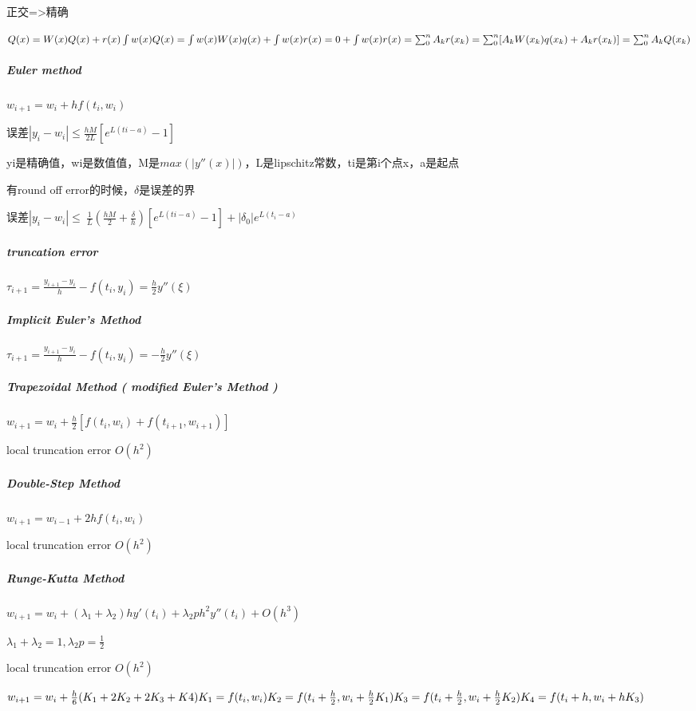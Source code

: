 \documentclass[]{article}
\let\oldsubparagraph\subparagraph
\renewcommand{\subparagraph}[1]{\oldsubparagraph{#1}\mbox{}}
\begin{document}
\begin{multicols}{3}
正交=\textgreater{}精确

\(Q(x)=W(x)Q(x)+r(x)\\
\int w(x)Q(x)=\int w(x)W(x)q(x) + \int w(x)r(x)=0+\int w(x)r(x)\\
=\sum_0^nA_kr(x_k)=\sum_0^n[A_kW(x_k)q(x_k)+A_kr(x_k)]=\sum_0^nA_kQ(x_k)\)



\subparagraph{Euler method}\label{header-c99}

\(w_{i+1}=w_i+h f(t_i, w_i)\)

误差\(|y_i-w_i|\leq\frac{hM}{2L}[e^{L(ti-a)}-1]\)

yi是精确值，wi是数值值，M是\(max(|y''(x)|)\)，L是lipschitz常数，ti是第i个点x，a是起点

有round off error的时候，\(\delta\)是误差的界

误差\( |y_i-w_i|\leq\ \frac 1 L (\frac{hM}{2}+\frac \delta h)[e^{L(ti-a)}-1] + |\delta _0|e^{L(t_i-a)}\)

\subparagraph{truncation error}\label{header-c110}

\(\tau_{i+1}=\frac{y_{i+1}-y_i}{h}-f(t_i,y_i)=\frac h 2 y''(\xi)\)

\subparagraph{Implicit Euler's Method}\label{header-c113}

\(\tau_{i+1}=\frac{y_{i+1}-y_i}{h}-f(t_i,y_i)=-\frac h 2 y''(\xi)\)

\subparagraph{Trapezoidal Method ( modified Euler's Method
)}\label{header-c116}

\(w_{i+1}=w_i+\frac h 2[f(t_i, w_i) + f(t_{i+1}, w_{i+1})]\)

local truncation error \(O(h^2)\)

\subparagraph{Double-Step Method}\label{header-c121}

\(w_{i+1}=w_{i-1}+2hf(t_i,w_i)\)

local truncation error \(O(h^2)\)

\subparagraph{Runge-Kutta Method}\label{header-c126}

\(w_{i+1}=w_i+(\lambda _1 + \lambda _2) h y'(t_i) + \lambda _2ph^2y''(t_i) + O(h^3)\)

\(\lambda _1 + \lambda _2=1,  \lambda _2 p=\frac 1 2\)

local truncation error \(O(h^2)\)

\(w_{i+1}=w_i+\frac h 6(K_1+2K_2+2K_3+K4)\\
K_1=f(t_i,w_i)\\
K_2=f(t_i+\frac h 2,w_i+\frac h 2 K_1)\\
K_3=f(t_i+\frac h 2,w_i+\frac h 2 K_2)\\
K_4=f(t_i+h,w_i+h K_3)\\\)


\end{multicols}
\end{document}
